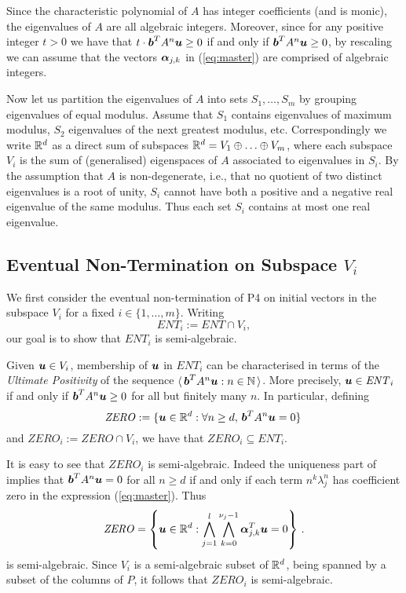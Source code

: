 Since the characteristic polynomial of $A$ has integer coefficients (and is monic), the eigenvalues of $A$ are all algebraic integers.  Moreover, since for any positive integer $t>0$ we have that $t\cdot \boldsymbol{b}^TA^n\boldsymbol{u} \geq 0$ if and only if $\boldsymbol{b}^TA^n\boldsymbol{u}\geq 0$, by rescaling we can assume that the vectors $\boldsymbol{\alpha}_{j,k}$ in (\ref{eq:master}) are comprised of algebraic integers.

Now let us partition the eigenvalues of $A$ into sets $S_1,\ldots,S_m$
by grouping eigenvalues of equal modulus.  Assume that $S_1$ contains
eigenvalues of maximum modulus, $S_2$ eigenvalues of the next greatest
modulus, etc.  Correspondingly we write $\mathbb{R}^{d}$ as a
direct sum of subspaces $\mathbb{R}^{d} = V_1 \oplus \ldots \oplus V_m$,
where each subspace $V_i$ is the sum of (generalised) eigenspaces of
$A$ associated to eigenvalues in $S_i$.  By the assumption that $A$ is
non-degenerate, i.e., that no quotient of two distinct eigenvalues is
a root of unity, $S_i$ cannot have both a positive and a negative real
eigenvalue of the same modulus.  Thus each set $S_i$ contains at most one
real eigenvalue.

\subsection{Eventual Non-Termination on Subspace $V_i$}
We first consider the eventual non-termination of \textsf{P4} on
initial vectors in the subspace $V_i$ for a fixed $i \in
\lbrace 1,\ldots,m\rbrace$.  Writing
\begin{equation*}
  \mathit{ENT}_i := \mathit{ENT} \cap V_i,
\end{equation*}
our goal is to show that $\mathit{ENT}_i$ is semi-algebraic.

Given $\boldsymbol{u} \in V_i$, membership of $\boldsymbol{u}$ in
$\mathit{ENT}_i$ can be characterised in terms of the \emph{Ultimate Positivity} of the sequence $\langle\,
\boldsymbol{b}^TA^n\boldsymbol{u}:n\in\mathbb{N}\,\rangle$.  More
precisely, $\boldsymbol{u} \in \mathit{ENT}_i$ if and only if
$\boldsymbol{b}^TA^n\boldsymbol{u} \geq 0$ for all but finitely many
$n$.  In particular, defining
\[ \mathit{ZERO}:=\lbrace \boldsymbol{u} \in \mathbb{R}^{d}: \forall
n\geq d,\, \boldsymbol{b}^TA^n\boldsymbol{u}=0 \rbrace \, \] and
$\mathit{ZERO}_i:=\mathit{ZERO}\cap V_i$, we have that
$\mathit{ZERO}_i\subseteq \mathit{ENT}_i$.

It is easy to see that $\mathit{ZERO}_i$ is semi-algebraic.  Indeed
the uniqueness part of~\cite[Proposition 2.11]{TUCS05} implies that
$\boldsymbol{b}^TA^n\boldsymbol{u}=0$ for all $n\geq d$ if and only if
each term $n^k\lambda_j^n$ has coefficient zero in the expression
(\ref{eq:master}).  Thus
\[ \mathit{ZERO} = \left\lbrace \boldsymbol{u}\in \mathbb{R}^{d} :
\bigwedge_{j=1}^{l}\bigwedge_{k=0}^{\nu_j-1}
\boldsymbol{\alpha}_{j,k}^T\boldsymbol{u}= 0 \right\rbrace \, .\] is
semi-algebraic.  Since $V_i$ is a semi-algebraic subset of
$\mathbb{R}^{d}$, being spanned by a subset of the columns of $P$, it
follows that $\mathit{ZERO}_i$ is semi-algebraic.

